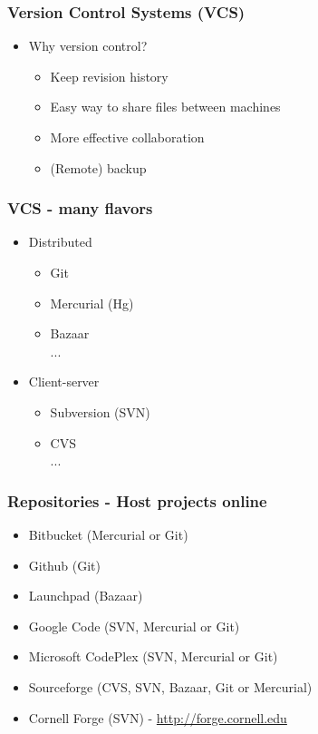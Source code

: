 \documentclass{beamer}
\begin{document}
\begin{frame}
  \frametitle{Version Control Systems (VCS)}

  \begin{itemize}
  \item Why version control?
  \vspace{5mm}
    \begin{itemize}
    \item Keep revision history
    \vspace{5mm}
    \item Easy way to share files between machines 
    \vspace{5mm}
    \item More effective collaboration
    \vspace{5mm}
    \item (Remote) backup
    \end{itemize}
  \end{itemize}

\end{frame}

\begin{frame}
  \frametitle{VCS - many flavors}

  \begin{itemize}
  \item Distributed
  \vspace{5mm}
    \begin{itemize}
    \item Git
    \item Mercurial (Hg) 
    \item Bazaar \\
    ...
    \end{itemize}
    \vspace{5mm}
  \item Client-server
    \begin{itemize}
    \item Subversion (SVN)
    \item CVS \\
    ...
    \end{itemize}
  \end{itemize}

\end{frame}

\begin{frame}
  \frametitle{Repositories - Host projects online}

  \begin{itemize}
  \item Bitbucket (Mercurial or Git)
  \item Github (Git)
  \item Launchpad (Bazaar)
  \item Google Code (SVN, Mercurial or Git)
  \item Microsoft CodePlex (SVN, Mercurial or Git)
  \item Sourceforge (CVS, SVN, Bazaar, Git or Mercurial)
  \item Cornell Forge (SVN) -  \url{http://forge.cornell.edu}
  \end{itemize}

\end{frame}
\end{document}
